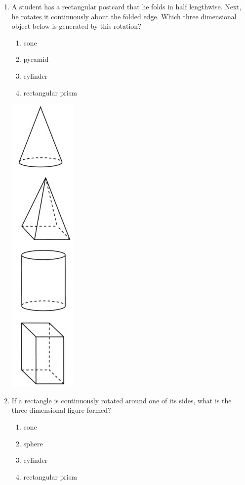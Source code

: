 \documentclass[12pt, oneside]{article}
\begin{document}
\begin{enumerate}[itemsep=0cm]
\item A student has a rectangular postcard that he folds in half lengthwise. Next, he rotates it continuously about the folded edge. Which three dimensional object below is generated by this rotation?
  \begin{multicols}{2}
  \begin{enumerate}
    \item cone
    \item pyramid
    \item cylinder
    \item rectangular prism
  \end{enumerate}
  \includegraphics[scale=0.5]{solids.png}
  \end{multicols}

\item If a rectangle is continuously rotated around one of its sides, what is the three-dimensional figure formed?
  \begin{multicols}{2}
  \begin{enumerate}
    \item cone
    \item sphere
    \item cylinder
    \item rectangular prism
  \end{enumerate}
\end{multicols}


\end{enumerate}
\end{document}
